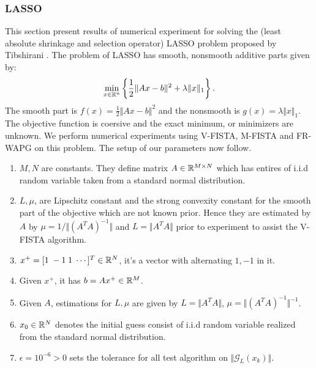 \documentclass[12pt]{article}
\begin{document}
        \subsubsection{LASSO}
            This section present results of numerical experiment for solving the (least absolute shrinkage and selection operator) LASSO problem proposed by Tibshirani \cite{tibshirani_regression_1996}. 
            The problem of LASSO has smooth, nonsmooth additive parts given by: 
            \begin{align*}
                \min_{x \in \mathbb R^n}
                \left\lbrace
                    \frac{1}{2}\Vert Ax - b\Vert^2 + \lambda\Vert x\Vert_1
                \right\rbrace. 
            \end{align*}
            The smooth part is $f(x) =\frac{1}{2}\Vert Ax - b\Vert^2$ and the nonsmooth is $g(x) = \lambda\Vert x\Vert_1$. 
            The objective function is coersive and the exact minimum, or minimizers are unknown. 
            We perform numerical experiments using V-FISTA, M-FISTA and FR-WAPG on this problem. 
            The setup of our parameters now follow. 
            \begin{enumerate}
                \item $M, N$ are constants. They define matrix $A \in \mathbb R^{M\times N}$ which has entires of i.i.d random variable taken from a standard normal distribution. 
                \item $L, \mu$, are Lipschitz constant and the strong convexity constant for the smooth part of the objective which are not known prior. Hence they are estimated by $A$ by $\mu = 1/\Vert (A^TA)^{-1}\Vert$ and $L = \Vert A^TA\Vert$ prior to experiment to assist the V-FISTA algorithm. 
                \item $x^+ = [1\; -1\; 1 \; \cdots ]^T \in \mathbb R^N$, it's a vector with alternating $1, -1$ in it. 
                \item Given $x^+$, it has $b = Ax^+ \in \mathbb R^M$. 
                \item Given $A$, estimations for $L,\mu$ are given by $L = \Vert A^TA\Vert$, $\mu = \Vert (A^TA)^{-1}\Vert^{-1}$. 
                \item $x_0\in \mathbb R^N$ denotes the initial guess consist of i.i.d random variable realized from the standard normal distribution. 
                \item $\epsilon = 10^{-6} > 0$ sets the tolerance for all test algorithm on $\Vert \mathcal G_L(x_k)\Vert$. 
            \end{enumerate}
\end{document}
